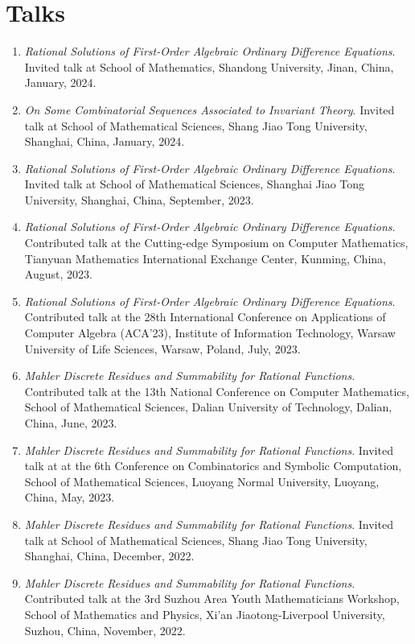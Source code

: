 \documentclass[a4paper,12pt]{article}
\begin{document}
\section*{\Large{Talks}}
\begin{enumerate}
\item {\em Rational Solutions of First-Order Algebraic Ordinary Difference Equations}. 
Invited talk at School of Mathematics, Shandong University, Jinan, China, January, 2024. 
\item {\em On Some Combinatorial Sequences Associated to Invariant Theory}. 
Invited talk at School of Mathematical Sciences, Shang Jiao Tong University, Shanghai, China, January, 2024. 
\item {\em Rational Solutions of First-Order Algebraic Ordinary Difference Equations}. 
Invited talk at School of Mathematical Sciences, Shanghai Jiao Tong University, Shanghai, China, September, 2023.
\item {\em Rational Solutions of First-Order Algebraic Ordinary Difference Equations}. 
Contributed talk at the Cutting-edge Symposium on Computer Mathematics, Tianyuan Mathematics International Exchange Center, Kunming, China, August, 2023.
\item {\em Rational Solutions of First-Order Algebraic Ordinary Difference Equations}. 
Contributed talk at the 28th International Conference on Applications of Computer Algebra (ACA'23), Institute of Information Technology, Warsaw University of Life Sciences, Warsaw, Poland, July, 2023.
\item {\em Mahler Discrete Residues and Summability for Rational Functions}. 
Contributed talk at the 13th National Conference on Computer Mathematics, School of Mathematical Sciences, Dalian University of Technology, Dalian, China, June, 2023. 
\item {\em Mahler Discrete Residues and Summability for Rational Functions}. 
Invited talk at at the 6th Conference on Combinatorics and Symbolic Computation, School of Mathematical Sciences, Luoyang Normal University, Luoyang, China, May, 2023. 
\item {\em Mahler Discrete Residues and Summability for Rational Functions}. 
Invited talk at School of Mathematical Sciences, Shang Jiao Tong University, Shanghai, China, December, 2022. 
\item {\em Mahler Discrete Residues and Summability for Rational Functions}. 
Contributed talk at the 3rd Suzhou Area Youth Mathematicians Workshop, School of Mathematics and Physics, Xi'an Jiaotong-Liverpool  University, Suzhou, China, November, 2022. 

\end{enumerate}
\end{document}
